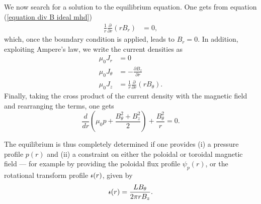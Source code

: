 \documentclass[my_thesis.tex]{subfiles}
\begin{document}
We now search for a solution to the equilibrium equation. One gets from equation (\ref{equation div B ideal mhd})
\begin{align}
\frac{1}{r}\frac{\partial}{\partial r}(r B_r) &= 0, 
\end{align}
which, once the boundary condition is applied, leads to $B_r=0$. In addition, exploiting Ampere's law, we write the current densities as
\begin{align}
	\mu_0J_r &= 0\\
	\mu_0J_\theta &= -\frac{\partial B_z}{\partial r}\\
	\mu_0J_z &= \frac{1}{r}\frac{\partial}{\partial r}(rB_\theta).
\end{align} 
Finally, taking the cross product of the current density with the magnetic field and rearranging the terms, one gets
\begin{equation}
	\frac{d}{dr}\left(\mu_0p + \frac{B_\theta^2 + B_z^2}{2}\right) + \frac{B_\theta^2}{r} = 0.
\end{equation}

The equilibrium is thus completely determined if one provides (i) a pressure profile $p(r)$ and (ii) a constraint on either the poloidal or toroidal magnetic field --- for example by providing the poloidal flux profile $\psi_p(r)$, or the rotational transform profile $\text{$\iota\!\!$-}(r)$, given by
\begin{equation}
	\text{$\iota\!\!$-}(r) = \frac{LB_\theta}{2\pi rB_z}.
\end{equation}


\end{document}
